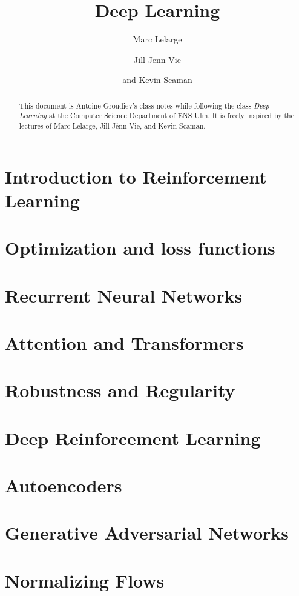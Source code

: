\documentclass[toc, titlepaged]{../cs-classes/cs-classes}
\title{Deep Learning}
\author{Marc Lelarge\and Jill-Jenn Vie\and and Kevin Scaman}
\begin{document}
\begin{abstract}
    This document is Antoine Groudiev's class notes while following the class \emph{Deep Learning} at the Computer Science Department of ENS Ulm. It is freely inspired by the lectures of Marc Lelarge, Jill-Jênn Vie, and Kevin Scaman. 
\end{abstract}





\section{Introduction to Reinforcement Learning}

\section{Optimization and loss functions}



\section{Recurrent Neural Networks}

\section{Attention and Transformers}

\section{Robustness and Regularity}

\section{Deep Reinforcement Learning}

\section{Autoencoders}

\section{Generative Adversarial Networks}

\section{Normalizing Flows}
\end{document}

